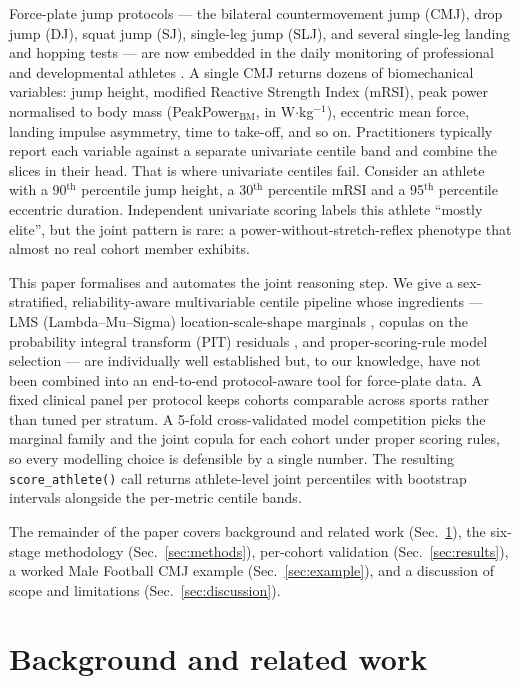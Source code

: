 \documentclass[10pt]{article}
\begin{document}
Force-plate jump protocols --- the bilateral countermovement jump
(CMJ), drop jump (DJ), squat jump (SJ), single-leg jump (SLJ), and
several single-leg landing and hopping tests --- are now embedded in
the daily monitoring of professional and developmental athletes
\cite{mcmahon2018cmj, flanagan2008rsi, bishop2018asymmetry}. A single
CMJ returns dozens of biomechanical variables: jump height, modified
Reactive Strength Index (mRSI), peak power normalised to body mass
(PeakPower$_{\text{BM}}$, in W$\cdot$kg$^{-1}$), eccentric mean force,
landing impulse asymmetry, time to take-off, and so on. Practitioners
typically report each variable against a separate univariate centile
band and combine the slices in their head. That is where univariate
centiles fail. Consider an athlete with a 90$^{\text{th}}$ percentile
jump height, a 30$^{\text{th}}$ percentile mRSI and a 95$^{\text{th}}$
percentile eccentric duration. Independent univariate scoring labels
this athlete ``mostly elite'', but the joint pattern is rare: a
power-without-stretch-reflex phenotype that almost no real cohort
member exhibits.

This paper formalises and automates the joint reasoning step. We give
a sex-stratified, reliability-aware multivariable centile pipeline
whose ingredients --- LMS (Lambda--Mu--Sigma) location-scale-shape
marginals \cite{cole1992lms, rigby2005gamlss}, copulas on the
probability integral transform (PIT) residuals
\cite{joe2014dependence, dissmann2013selecting}, and proper-scoring-rule
model selection \cite{gneiting2007proper, gneiting2008assessing} --- are
individually well established but, to our knowledge, have not been
combined into an end-to-end protocol-aware tool for force-plate data.
A fixed clinical panel per protocol keeps cohorts comparable across
sports rather than tuned per stratum. A 5-fold cross-validated model
competition picks the marginal family and the joint copula for each
cohort under proper scoring rules, so every modelling choice is
defensible by a single number. The resulting
\texttt{score\_athlete()} call returns athlete-level joint percentiles
with bootstrap intervals alongside the per-metric centile bands.

The remainder of the paper covers background and related work
(Sec.~\ref{sec:related}), the six-stage methodology
(Sec.~\ref{sec:methods}), per-cohort validation
(Sec.~\ref{sec:results}), a worked Male Football CMJ example
(Sec.~\ref{sec:example}), and a discussion of scope and limitations
(Sec.~\ref{sec:discussion}).

\section{Background and related work}
\label{sec:related}
\end{document}
